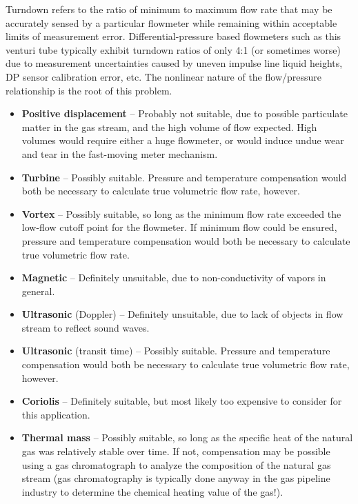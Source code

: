 
Turndown refers to the ratio of minimum to maximum flow rate that may be accurately sensed by a particular flowmeter while remaining within acceptable limits of measurement error.  Differential-pressure based flowmeters such as this venturi tube typically exhibit turndown ratios of only 4:1 (or sometimes worse) due to measurement uncertainties caused by uneven impulse line liquid heights, DP sensor calibration error, etc.  The nonlinear nature of the flow/pressure relationship is the root of this problem.

\vskip 10pt

\begin{itemize}
\item{} {\bf Positive displacement} -- Probably not suitable, due to possible particulate matter in the gas stream, and the high volume of flow expected.  High volumes would require either a huge flowmeter, or would induce undue wear and tear in the fast-moving meter mechanism.
\vskip 10pt
\item{} {\bf Turbine} -- Possibly suitable.  Pressure and temperature compensation would both be necessary to calculate true volumetric flow rate, however.
\vskip 10pt
\item{} {\bf Vortex} -- Possibly suitable, so long as the minimum flow rate exceeded the low-flow cutoff point for the flowmeter.  If minimum flow could be ensured, pressure and temperature compensation would both be necessary to calculate true volumetric flow rate.
\vskip 10pt
\item{} {\bf Magnetic} -- Definitely unsuitable, due to non-conductivity of vapors in general.
\vskip 10pt
\item{} {\bf Ultrasonic} (Doppler) -- Definitely unsuitable, due to lack of objects in flow stream to reflect sound waves. 
\vskip 10pt
\item{} {\bf Ultrasonic} (transit time) -- Possibly suitable.  Pressure and temperature compensation would both be necessary to calculate true volumetric flow rate, however.
\vskip 10pt
\item{} {\bf Coriolis} -- Definitely suitable, but most likely too expensive to consider for this application.
\vskip 10pt
\item{} {\bf Thermal mass} -- Possibly suitable, so long as the specific heat of the natural gas was relatively stable over time.  If not, compensation may be possible using a gas chromatograph to analyze the composition of the natural gas stream (gas chromatography is typically done anyway in the gas pipeline industry to determine the chemical heating value of the gas!).
\end{itemize}

 










